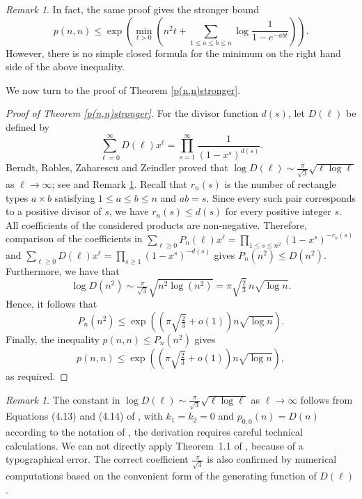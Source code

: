 \documentclass[12pt,a4paper]{amsart}
\numberwithin{equation}{section}
\theoremstyle{plain}
\theoremstyle{definition}
\theoremstyle{remark}
\newtheorem{re}[thm]{Remark}
\begin{document}
\begin{re}
In fact, the same proof gives the stronger bound
$$
p(n,n)
\le
\exp\!\left(
\min_{t>0}
\left(
n^2t+
\sum_{1\le a\le b\le n}
\log\frac{1}{1-e^{-abt}}
\right)
\right).
$$
However, there is no simple closed formula for the minimum on the right hand side of the above inequality.
\end{re}
We now turn to the proof of Theorem \ref{p(n,n)stronger}.
\begin{proof}[Proof of Theorem \ref{p(n,n)stronger}] 
For the divisor function $d(s)$, let $D(\ell)$ be defined by $$\sum_{\ell=0}^{\infty}D(\ell)x^\ell=\prod_{s=1}^{\infty}\frac{1}{(1-x^s)^{d(s)}}.$$ 
Berndt, Robles, Zaharescu and Zeindler proved that $\log D(\ell)\sim\frac{\pi}{\sqrt3}\sqrt{\ell\log\ell}$ as $\ell\to\infty$; see \cite[Equations (4.13) and~(4.14)]{BerndtRoblesZaharescuZeindler} and Remark \ref{blad}. 
Recall that $r_n(s)$ is the number of rectangle types $a\times b$ satisfying $1\le  a\le  b\le  n$ and $ab=s$. Since every such pair corresponds to a positive divisor of $s$, we have $r_n(s)\le  d(s)$ for every positive integer $s$. All coefficients of the considered products are non-negative. Therefore, comparison of the coefficients in $\sum_{\ell\geq0}P_n(\ell)x^\ell=\prod_{1\leq s\leq n^2}(1-x^s)^{-r_n(s)}$ and $\sum_{\ell\geq0}D(\ell)x^\ell=\prod_{s\geq1 }(1-x^s)^{-d(s)}$ gives $P_n(n^2)\le  D(n^2).$ Furthermore, we have that  $$\log D(n^2)\sim\tfrac{\pi}{\sqrt3}\sqrt{n^2\log(n^2)}=\pi\sqrt{\tfrac{2}{3}}\,n\sqrt{\log n}.$$ Hence, it follows that $$P_n(n^2)\le \exp\left(\left(\pi\sqrt{\tfrac{2}{3}}+o(1)\right)n\sqrt{\log n}\right).$$ Finally, the inequality $p(n,n)\le  P_n(n^2)$ gives $$p(n,n)\le \exp\left(\left(\pi\sqrt{\tfrac{2}{3}}+o(1)\right)n\sqrt{\log n}\right),$$ as required. 
\end{proof}

\begin{re}\label{blad}
The constant in $\log D(\ell)\sim\frac{\pi}{\sqrt3}\sqrt{\ell\log\ell}$ as $\ell\to\infty$ follows from Equations (4.13) and (4.14) of \cite{BerndtRoblesZaharescuZeindler}, with $k_1=k_2=0$ and $p_{0,0}(n)=D(n)$ according to the notation of \cite{BerndtRoblesZaharescuZeindler}, the derivation requires careful technical calculations. We can not directly apply Theorem~1.1 of \cite{BerndtRoblesZaharescuZeindler}, because of a typographical error. The correct coefficient $\frac{\pi}{\sqrt3}$ is also confirmed by numerical computations based on the convenient form of the generating function of $D(\ell)$.
\end{re}
\end{document}
